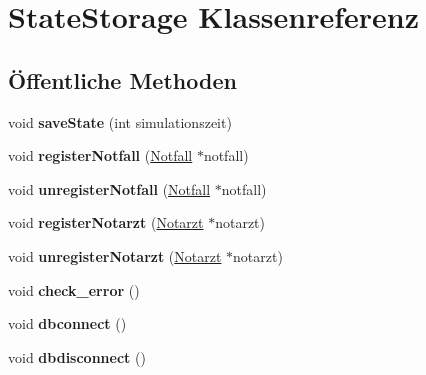 \hypertarget{classStateStorage}{}\section{State\+Storage Klassenreferenz}
\label{classStateStorage}
\subsection*{Öffentliche Methoden}
\begin{DoxyCompactItemize}
\item 
void {\bfseries save\+State} (int simulationszeit)\hypertarget{classStateStorage_a1de4d72e6b1fd1bdb2bca638a115412d}{}\label{classStateStorage_a1de4d72e6b1fd1bdb2bca638a115412d}

\item 
void {\bfseries register\+Notfall} (\hyperlink{classNotfall}{Notfall} $\ast$notfall)\hypertarget{classStateStorage_ab0db339611f52d600525780596f1c836}{}\label{classStateStorage_ab0db339611f52d600525780596f1c836}

\item 
void {\bfseries unregister\+Notfall} (\hyperlink{classNotfall}{Notfall} $\ast$notfall)\hypertarget{classStateStorage_a231238d0d1323f35f122758b60a5f57e}{}\label{classStateStorage_a231238d0d1323f35f122758b60a5f57e}

\item 
void {\bfseries register\+Notarzt} (\hyperlink{classNotarzt}{Notarzt} $\ast$notarzt)\hypertarget{classStateStorage_a58fbeab4cfe7baff4074e354898d5ade}{}\label{classStateStorage_a58fbeab4cfe7baff4074e354898d5ade}

\item 
void {\bfseries unregister\+Notarzt} (\hyperlink{classNotarzt}{Notarzt} $\ast$notarzt)\hypertarget{classStateStorage_aff781895425916eb0fe251ec0cccfcfe}{}\label{classStateStorage_aff781895425916eb0fe251ec0cccfcfe}

\item 
void {\bfseries check\+\_\+error} ()\hypertarget{classStateStorage_af0501a41dad1506616ed783e6181cb05}{}\label{classStateStorage_af0501a41dad1506616ed783e6181cb05}

\item 
void {\bfseries dbconnect} ()\hypertarget{classStateStorage_afaa0feafcaf5d241aefd34b53563d25e}{}\label{classStateStorage_afaa0feafcaf5d241aefd34b53563d25e}

\item 
void {\bfseries dbdisconnect} ()\hypertarget{classStateStorage_ae858cb92232b1b097364803e1677670e}{}\label{classStateStorage_ae858cb92232b1b097364803e1677670e}


\end{DoxyCompactItemize}
